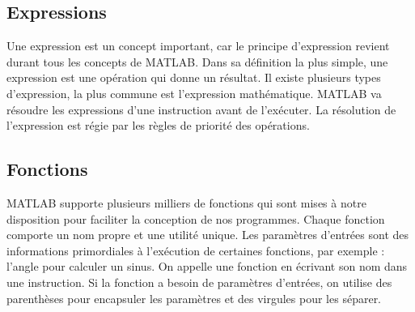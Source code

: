 \documentclass{tufte-handout}
\begin{document}
\subsection{Expressions}
Une expression est un concept important, car le principe d'expression revient durant tous les concepts de MATLAB.
Dans sa définition la plus simple, une expression est une opération qui donne un résultat. Il existe plusieurs types d'expression, la plus commune est l'expression mathématique.
MATLAB va résoudre les expressions d'une instruction avant de l'exécuter.
La résolution de l'expression est régie par les règles de priorité des opérations.
\subsection{Fonctions}
MATLAB supporte plusieurs milliers de fonctions qui sont mises à notre disposition pour faciliter la conception de nos programmes. Chaque fonction comporte un nom propre et une utilité unique.
Les paramètres d'entrées sont des informations primordiales à l'exécution de certaines fonctions, par exemple : l'angle pour calculer un sinus.
On appelle une fonction en écrivant son nom dans une instruction. Si la fonction a besoin de paramètres d'entrées, on utilise des parenthèses pour encapsuler les paramètres et des virgules pour les séparer.
\end{document}
